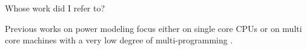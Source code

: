 
Whose work did I refer to?

Previous works on power modeling focus either on single core CPUs
\cite{kellner03tempcontrol} or on multi core machines with a very low degree of
multi-programming \cite{Bertran2010,bertran2010decomposable}.
